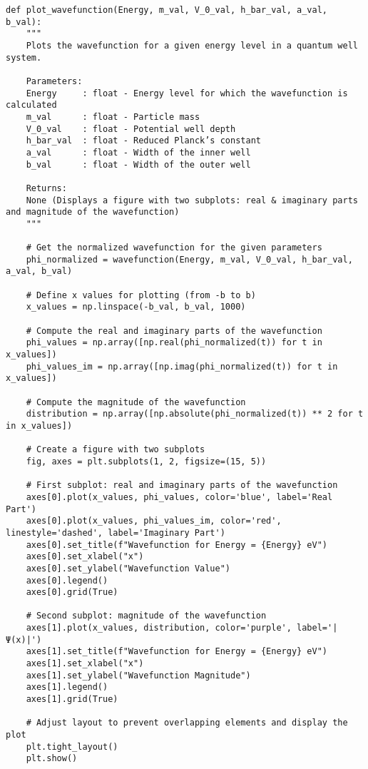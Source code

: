 \documentclass[11pt]{article}
\begin{document}
\begin{verbatim}
def plot_wavefunction(Energy, m_val, V_0_val, h_bar_val, a_val, b_val):
    """
    Plots the wavefunction for a given energy level in a quantum well system.

    Parameters:
    Energy     : float - Energy level for which the wavefunction is calculated
    m_val      : float - Particle mass
    V_0_val    : float - Potential well depth
    h_bar_val  : float - Reduced Planck’s constant
    a_val      : float - Width of the inner well
    b_val      : float - Width of the outer well

    Returns:
    None (Displays a figure with two subplots: real & imaginary parts and magnitude of the wavefunction)
    """

    # Get the normalized wavefunction for the given parameters
    phi_normalized = wavefunction(Energy, m_val, V_0_val, h_bar_val, a_val, b_val)

    # Define x values for plotting (from -b to b)
    x_values = np.linspace(-b_val, b_val, 1000)

    # Compute the real and imaginary parts of the wavefunction
    phi_values = np.array([np.real(phi_normalized(t)) for t in x_values])
    phi_values_im = np.array([np.imag(phi_normalized(t)) for t in x_values])

    # Compute the magnitude of the wavefunction
    distribution = np.array([np.absolute(phi_normalized(t)) ** 2 for t in x_values])

    # Create a figure with two subplots
    fig, axes = plt.subplots(1, 2, figsize=(15, 5))

    # First subplot: real and imaginary parts of the wavefunction
    axes[0].plot(x_values, phi_values, color='blue', label='Real Part')
    axes[0].plot(x_values, phi_values_im, color='red', linestyle='dashed', label='Imaginary Part')
    axes[0].set_title(f"Wavefunction for Energy = {Energy} eV")
    axes[0].set_xlabel("x")
    axes[0].set_ylabel("Wavefunction Value")
    axes[0].legend()
    axes[0].grid(True)

    # Second subplot: magnitude of the wavefunction
    axes[1].plot(x_values, distribution, color='purple', label='|Ψ(x)|')
    axes[1].set_title(f"Wavefunction for Energy = {Energy} eV")
    axes[1].set_xlabel("x")
    axes[1].set_ylabel("Wavefunction Magnitude")
    axes[1].legend()
    axes[1].grid(True)

    # Adjust layout to prevent overlapping elements and display the plot
    plt.tight_layout()
    plt.show()
\end{verbatim}
\end{document}
